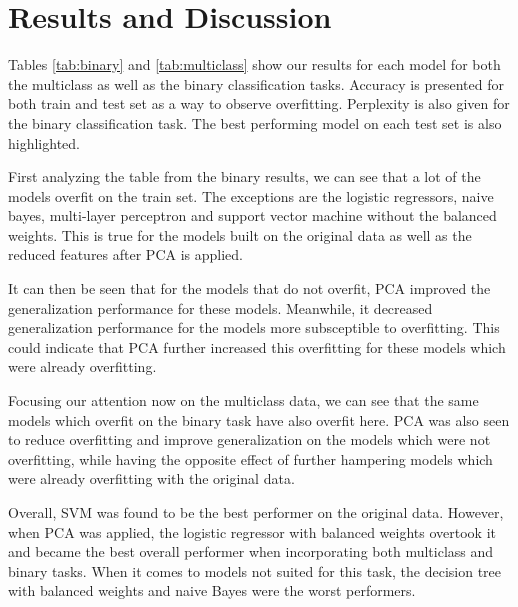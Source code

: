 \chapter{Results and Discussion}



Tables \ref{tab:binary} and \ref{tab:multiclass} show our results for each model for both the multiclass as well as the binary classification tasks. Accuracy is presented for both train and test set as a way to observe overfitting. Perplexity is also given for the binary classification task. The best performing model on each test set is also highlighted.

First analyzing the table from the binary results, we can see that a lot of the models overfit on the train set. The exceptions are the logistic regressors, naive bayes, multi-layer perceptron and support vector machine without the balanced weights. This is true for the models built on the original data as well as the reduced features after PCA is applied.

It can then be seen that for the models that do not overfit, PCA improved the generalization performance for these models. Meanwhile, it decreased generalization performance for the models more subsceptible to overfitting. This could indicate that PCA further increased this overfitting for these models which were already overfitting.

Focusing our attention now on the multiclass data, we can see that the same models which overfit on the binary task have also overfit here. PCA was also seen to reduce overfitting and improve generalization on the models which were not overfitting, while having the opposite effect of further hampering models which were already overfitting with the original data.

Overall, SVM was found to be the best performer on the original data. However, when PCA was applied, the logistic regressor with balanced weights overtook it and became the best overall performer when incorporating both multiclass and binary tasks. When it comes to models not suited for this task, the decision tree with balanced weights and naive Bayes were the worst performers.
